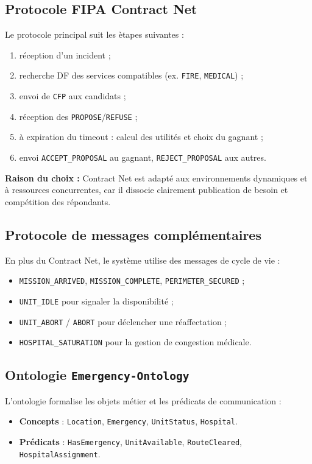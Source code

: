\documentclass[12pt,a4paper]{article}
\begin{document}
\subsection{Protocole FIPA Contract Net}
Le protocole principal suit les \`etapes suivantes :
\begin{enumerate}
    \item r\'eception d'un incident ;
    \item recherche DF des services compatibles (ex. \texttt{FIRE}, \texttt{MEDICAL}) ;
    \item envoi de \texttt{CFP} aux candidats ;
    \item r\'eception des \texttt{PROPOSE}/\texttt{REFUSE} ;
    \item \`a expiration du timeout : calcul des utilit\'es et choix du gagnant ;
    \item envoi \texttt{ACCEPT\_PROPOSAL} au gagnant, \texttt{REJECT\_PROPOSAL} aux autres.
\end{enumerate}

\textbf{Raison du choix :} Contract Net est adapt\'e aux environnements dynamiques et \`a ressources concurrentes, car il dissocie clairement publication de besoin et comp\'etition des r\'epondants.

\subsection{Protocole de messages compl\'ementaires}
En plus du Contract Net, le syst\`eme utilise des messages de cycle de vie :
\begin{itemize}
    \item \texttt{MISSION\_ARRIVED}, \texttt{MISSION\_COMPLETE}, \texttt{PERIMETER\_SECURED} ;
    \item \texttt{UNIT\_IDLE} pour signaler la disponibilit\'e ;
    \item \texttt{UNIT\_ABORT} / \texttt{ABORT} pour d\'eclencher une r\'eaffectation ;
    \item \texttt{HOSPITAL\_SATURATION} pour la gestion de congestion m\'edicale.
\end{itemize}

\subsection{Ontologie \texttt{Emergency-Ontology}}
L'ontologie formalise les objets m\'etier et les pr\'edicats de communication :
\begin{itemize}
    \item \textbf{Concepts} : \texttt{Location}, \texttt{Emergency}, \texttt{UnitStatus}, \texttt{Hospital}.
    \item \textbf{Pr\'edicats} : \texttt{HasEmergency}, \texttt{UnitAvailable}, \texttt{RouteCleared}, \texttt{HospitalAssignment}.
\end{itemize}
\end{document}
